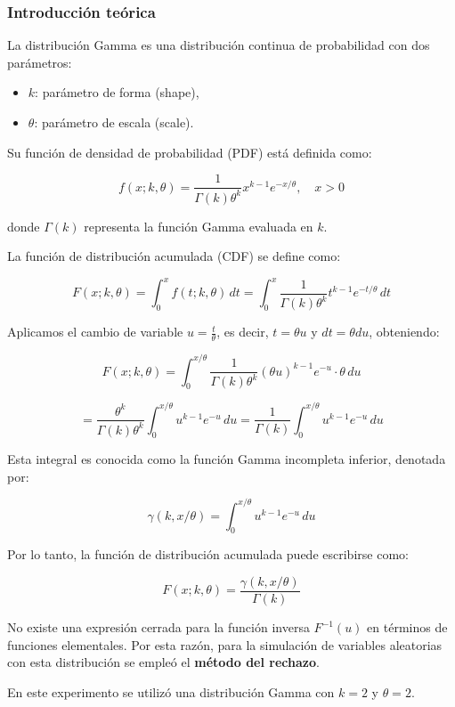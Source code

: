 \documentclass{article}
\begin{document}
\subsubsection{Introducción teórica}

La distribución Gamma es una distribución continua de probabilidad con dos parámetros:
\begin{itemize}
    \item $k$: parámetro de forma (shape),
    \item $\theta$: parámetro de escala (scale).
\end{itemize}

Su función de densidad de probabilidad (PDF) está definida como:

\[
f(x; k, \theta) = \frac{1}{\Gamma(k)\theta^k} x^{k-1} e^{-x/\theta}, \quad x > 0
\]

donde $\Gamma(k)$ representa la función Gamma evaluada en $k$.

La función de distribución acumulada (CDF) se define como:

\[
F(x; k, \theta) = \int_0^x f(t; k, \theta) \, dt = \int_0^x \frac{1}{\Gamma(k)\theta^k} t^{k-1} e^{-t/\theta} \, dt
\]

Aplicamos el cambio de variable \( u = \frac{t}{\theta} \), es decir, \( t = \theta u \) y \( dt = \theta du \), obteniendo:

\[
F(x; k, \theta) = \int_0^{x/\theta} \frac{1}{\Gamma(k)\theta^k} (\theta u)^{k-1} e^{-u} \cdot \theta \, du
\]

\[
= \frac{\theta^k}{\Gamma(k)\theta^k} \int_0^{x/\theta} u^{k-1} e^{-u} \, du = \frac{1}{\Gamma(k)} \int_0^{x/\theta} u^{k-1} e^{-u} \, du
\]

Esta integral es conocida como la función Gamma incompleta inferior, denotada por:

\[
\gamma(k, x/\theta) = \int_0^{x/\theta} u^{k-1} e^{-u} \, du
\]

Por lo tanto, la función de distribución acumulada puede escribirse como:

\[
F(x; k, \theta) = \frac{\gamma(k, x/\theta)}{\Gamma(k)}
\]

No existe una expresión cerrada para la función inversa \( F^{-1}(u) \) en términos de funciones elementales. Por esta razón, para la simulación de variables aleatorias con esta distribución se empleó el \textbf{método del rechazo}.

En este experimento se utilizó una distribución Gamma con $k = 2$ y $\theta = 2$.
\end{document}
